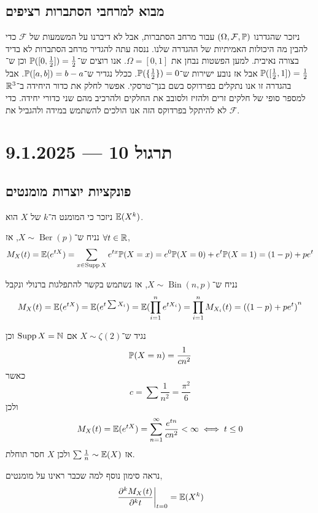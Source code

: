 \subsection{מבוא למרחבי הסתברות רציפים}
ניזכר שהגדרנו $(\Omega, \mathcal{F}, \mathbb{P})$ עבור מרחב הסתברות, אבל לא דיברנו על המשמעות של $\mathcal{F}$ כדי להבין מה היכולות האמיתיות של ההגדרה שלנו.
ננסה עתה להגדיר מרחב הסתברות לא בדיד בצורה נאיבית. למען הפשטות נבחן את $\Omega = [0, 1]$.
אנו רוצים ש־$\mathbb{P}([0, \frac{1}{2}]) = \frac{1}{2}$ וכן ש־$\mathbb{P}([\frac{1}{2}, 1]) = \frac{1}{2}$ אבל אז נובע ישירות ש־$\mathbb{P}(\{\frac{1}{2}\}) = 0$.
ככלל נגדיר ש־$\mathbb{P}([a, b]) = b - a$.
אבל בהגדרה זו אנו נתקלים בפרדוקס בשם בנך־טרסקי.
אפשר לחלק את כדור היחידה ב־$\mathbb{R}^3$ למספר סופי של חלקים זרים ולהזיז ולסובב את החלקים ולהרכיב מהם שני כדורי יחידה.
כדי לא להיתקל בפרדוקס הזה אנו הולכים להשתמש במידה ולהגביל את $\mathcal{F}$.

\section{תרגול 10 --- 9.1.2025}
\subsection{פונקציות יוצרות מומנטים}
ניזכר כי המומנט ה־$k$ של $X$ הוא $\mathbb{E}(X^k)$.
\begin{example}
	נניח ש־$X \sim \operatorname{Ber}(p)$, אז $\forall t \in \mathbb{R}$,
	\[
		M_X(t)
		= \mathbb{E}(e^{tX})
		= \sum_{x \in \operatorname{Supp} X} e^{tx} \mathbb{P}(X = x)
		= e^0 \mathbb{P}(X = 0) + e^t \mathbb{P}(X = 1)
		= (1 - p) + p e^t
	\]
\end{example}
\begin{example}
	נניח ש־$X \sim \operatorname{Bin}(n, p)$, אז נשתמש בקשר להתפלגות ברנולי ונקבל
	\[
		M_X(t)
		= \mathbb{E}(e^{tX})
		= \mathbb{E}(e^{t \sum X_i})
		= \mathbb{E}(\prod_{i = 1}^n e^{t X_i})
		= \prod_{i = 1}^n M_{X_i}(t)
		= {((1 - p) + p e^t)}^n
	\]
\end{example}
\begin{example}
	נגיד ש־$X \sim \zeta(2)$ אם $\operatorname{Supp} X = \mathbb{N}$ וכן
	\[
		\mathbb{P}(X = n)
		= \frac{1}{c n^2}
	\]
	כאשר
	\[
		c = \sum \frac{1}{n^2} = \frac{\pi^2}{6}
	\]
	ולכן
	\[
		M_X(t)
		= \mathbb{E}(e^{tX})
		= \sum_{n = 1}^{\infty} \frac{e^{tn}}{c n^2}
		< \infty
		\iff
		t \le 0
	\]
	אז $\sum \frac{1}{n} \sim \mathbb{E}(X)$ ולכן $X$ חסר תוחלת.
\end{example}
\begin{remark}
	נראה סימון נוסף למה שכבר ראינו על מומנטים,
	\[
		\left. \frac{\partial^k M_X(t)}{\partial^k t} \right\lvert_{t = 0} = \mathbb{E}(X^k)
	\]
\end{remark}

